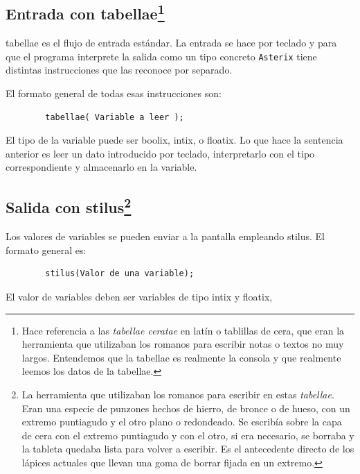 \documentclass[a4paper, 10pt]{article}
\newcommand{\atx}{\texttt{Asterix} }
\begin{document}
    \subsection*{Entrada con tabellae\footnote{Hace referencia a las
    \textit{tabellae ceratae} en latín o tablillas de cera, que eran la
    herramienta que utilizaban los romanos para escribir notas o textos no muy
    largos. Entendemos que la tabellae es realmente la consola y que realmente
    leemos los datos de la tabellae.}}
    
    \textsf{tabellae} es el flujo de entrada estándar. La entrada se hace por
    teclado y para que el programa interprete la salida como un tipo concreto
    \atx tiene distintas instrucciones que las reconoce por separado.
    
    El formato general de todas esas instrucciones son:
    
    \begin{verbatim}
        tabellae( Variable a leer );
    \end{verbatim}
    
    El tipo de la variable  puede ser \textsf{boolix}, \textsf{intix}, o
    \textsf{floatix}. Lo que hace la sentencia anterior es leer un dato
    introducido por teclado, interpretarlo con el tipo correspondiente y
    almacenarlo en la variable. 

    \subsection*{Salida con stilus\footnote{La herramienta que utilizaban los
    romanos para escribir en estas \textit{tabellae}. Eran una especie de
    punzones hechos de hierro, de bronce o de hueso, con un extremo puntiagudo
    y el otro plano o redondeado. Se escribía sobre la capa de cera con el
    extremo puntiagudo y con el otro, si era necesario, se borraba y la tableta
    quedaba lista para volver a escribir. Es el antecedente directo de los
    lápices actuales que llevan una goma de borrar fijada en un extremo.}}
    
     Los valores de variables se pueden enviar a la pantalla empleando
     \textsf{stilus}. El formato general es:
    
    \begin{verbatim}
        stilus(Valor de una variable);
    \end{verbatim}
    
    El valor de variables deben ser variables de tipo \textsf{intix} y \textsf{floatix},
    
\end{document}
